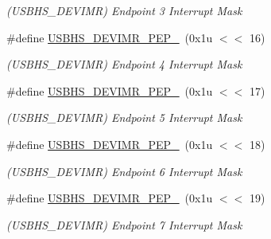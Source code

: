 \begin{DoxyCompactItemize}
\begin{DoxyCompactList}\small\item\em (U\+S\+B\+H\+S\+\_\+\+D\+E\+V\+I\+MR) Endpoint 3 Interrupt Mask \end{DoxyCompactList}\item 
\mbox{\label{group__SAMV71__USBHS_ga42e100b990f972d7dc54483b1aa8462a}} 
\#define \mbox{\hyperlink{group__SAMV71__USBHS_ga42e100b990f972d7dc54483b1aa8462a}{U\+S\+B\+H\+S\+\_\+\+D\+E\+V\+I\+M\+R\+\_\+\+P\+E\+P\+\_}}~(0x1u $<$$<$ 16)
\begin{DoxyCompactList}\small\item\em (U\+S\+B\+H\+S\+\_\+\+D\+E\+V\+I\+MR) Endpoint 4 Interrupt Mask \end{DoxyCompactList}\item 
\mbox{\label{group__SAMV71__USBHS_ga0a689d341cf92739cd753c87e9d4c37a}} 
\#define \mbox{\hyperlink{group__SAMV71__USBHS_ga0a689d341cf92739cd753c87e9d4c37a}{U\+S\+B\+H\+S\+\_\+\+D\+E\+V\+I\+M\+R\+\_\+\+P\+E\+P\+\_}}~(0x1u $<$$<$ 17)
\begin{DoxyCompactList}\small\item\em (U\+S\+B\+H\+S\+\_\+\+D\+E\+V\+I\+MR) Endpoint 5 Interrupt Mask \end{DoxyCompactList}\item 
\mbox{\label{group__SAMV71__USBHS_gaf2daf6a675d98da260df1647c31a6649}} 
\#define \mbox{\hyperlink{group__SAMV71__USBHS_gaf2daf6a675d98da260df1647c31a6649}{U\+S\+B\+H\+S\+\_\+\+D\+E\+V\+I\+M\+R\+\_\+\+P\+E\+P\+\_}}~(0x1u $<$$<$ 18)
\begin{DoxyCompactList}\small\item\em (U\+S\+B\+H\+S\+\_\+\+D\+E\+V\+I\+MR) Endpoint 6 Interrupt Mask \end{DoxyCompactList}\item 
\mbox{\label{group__SAMV71__USBHS_gaa388c7e97ef7d81bc8080fb440273785}} 
\#define \mbox{\hyperlink{group__SAMV71__USBHS_gaa388c7e97ef7d81bc8080fb440273785}{U\+S\+B\+H\+S\+\_\+\+D\+E\+V\+I\+M\+R\+\_\+\+P\+E\+P\+\_}}~(0x1u $<$$<$ 19)
\begin{DoxyCompactList}\small\item\em (U\+S\+B\+H\+S\+\_\+\+D\+E\+V\+I\+MR) Endpoint 7 Interrupt Mask \end{DoxyCompactList}\item 

\end{DoxyCompactItemize}
